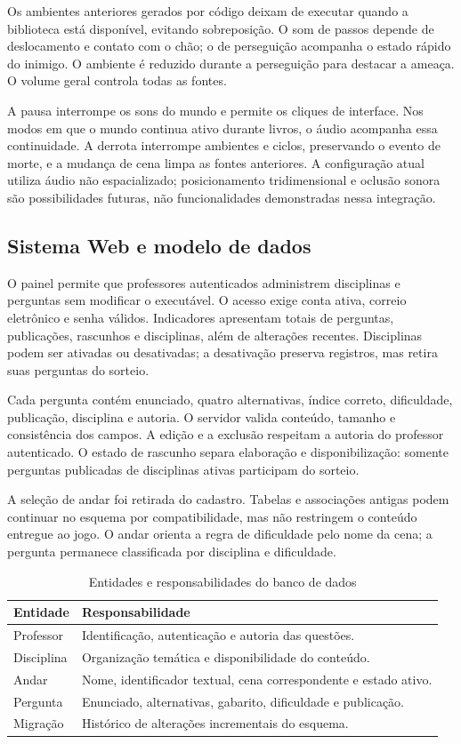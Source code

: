 \documentclass[12pt]{article}
\begin{document}
Os ambientes anteriores gerados por código deixam de executar quando a biblioteca está disponível, evitando sobreposição. O som de passos depende de deslocamento e contato com o chão; o de perseguição acompanha o estado rápido do inimigo. O ambiente é reduzido durante a perseguição para destacar a ameaça. O volume geral controla todas as fontes.

A pausa interrompe os sons do mundo e permite os cliques de interface. Nos modos em que o mundo continua ativo durante livros, o áudio acompanha essa continuidade. A derrota interrompe ambientes e ciclos, preservando o evento de morte, e a mudança de cena limpa as fontes anteriores. A configuração atual utiliza áudio não espacializado; posicionamento tridimensional e oclusão sonora são possibilidades futuras, não funcionalidades demonstradas nessa integração.

\subsection{Sistema Web e modelo de dados}

O painel permite que professores autenticados administrem disciplinas e perguntas sem modificar o executável. O acesso exige conta ativa, correio eletrônico e senha válidos. Indicadores apresentam totais de perguntas, publicações, rascunhos e disciplinas, além de alterações recentes. Disciplinas podem ser ativadas ou desativadas; a desativação preserva registros, mas retira suas perguntas do sorteio.

Cada pergunta contém enunciado, quatro alternativas, índice correto, dificuldade, publicação, disciplina e autoria. O servidor valida conteúdo, tamanho e consistência dos campos. A edição e a exclusão respeitam a autoria do professor autenticado. O estado de rascunho separa elaboração e disponibilização: somente perguntas publicadas de disciplinas ativas participam do sorteio.

A seleção de andar foi retirada do cadastro. Tabelas e associações antigas podem continuar no esquema por compatibilidade, mas não restringem o conteúdo entregue ao jogo. O andar orienta a regra de dificuldade pelo nome da cena; a pergunta permanece classificada por disciplina e dificuldade.

\begin{table}[H]
\centering
\caption{Entidades e responsabilidades do banco de dados}
\label{tab:modelo-dados}
\small
\begin{tabularx}{\textwidth}{p{2.6cm}X}
\toprule
\textbf{Entidade} & \textbf{Responsabilidade} \\
\midrule
Professor & Identificação, autenticação e autoria das questões. \\
Disciplina & Organização temática e disponibilidade do conteúdo. \\
Andar & Nome, identificador textual, cena correspondente e estado ativo. \\
Pergunta & Enunciado, alternativas, gabarito, dificuldade e publicação. \\
Migração & Histórico de alterações incrementais do esquema. \\
\bottomrule
\end{tabularx}
\end{table}
\end{document}
